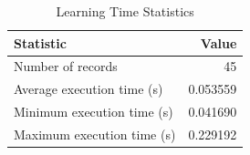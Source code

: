 
\begin{table}[h!]
\centering
\begin{tabular}{l r}
\hline
Statistic & Value \\
\hline
Number of records & 45 \\
Average execution time (s) & 0.053559 \\
Minimum execution time (s) & 0.041690 \\
Maximum execution time (s) & 0.229192 \\
\hline
\end{tabular}
\caption{Learning Time Statistics}
\end{table}
